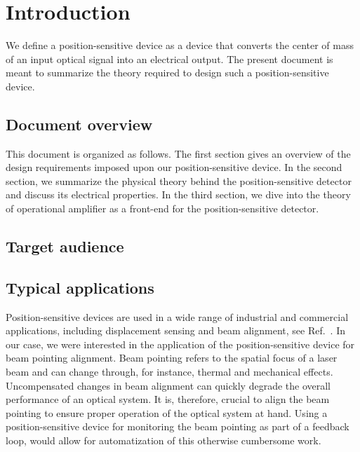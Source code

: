\section{Introduction}

We define a position-sensitive device as a device that converts the center of mass of an input optical signal into an electrical output.
The present document is meant to summarize the theory required to design such a position-sensitive device.

\subsection{Document overview}

This document is organized as follows.
The first section gives an overview of the design requirements imposed upon our position-sensitive device.
In the second section, we summarize the physical theory behind the position-sensitive detector and discuss its electrical properties.
In the third section, we dive into the theory of operational amplifier as a front-end for the position-sensitive detector.

\subsection{Target audience}

\subsection{Typical applications}

Position-sensitive devices are used in a wide range of industrial and commercial applications, including displacement sensing and beam alignment, see Ref.~\cite[p.~22]{Maekynen00}.
In our case, we were interested in the application of the position-sensitive device for beam pointing alignment.
Beam pointing refers to the spatial focus of a laser beam and can change through, for instance, thermal and mechanical effects.
Uncompensated changes in beam alignment can quickly degrade the overall performance of an optical system.
It is, therefore, crucial to align the beam pointing to ensure proper operation of the optical system at hand.
Using a position-sensitive device for monitoring the beam pointing as part of a feedback loop, would allow for automatization of this otherwise cumbersome work.